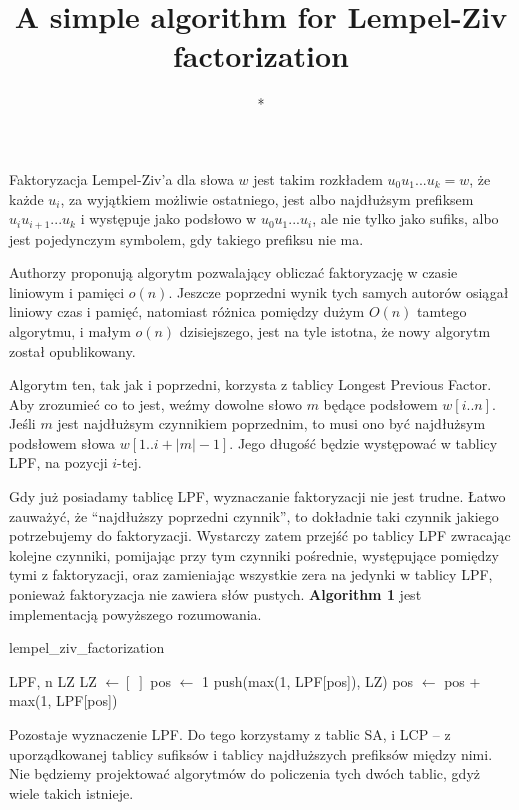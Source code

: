 \documentclass[a4paper,12pt]{article}
\title{A simple algorithm for Lempel-Ziv factorization}
\author{*}
\theoremstyle{definition}
\begin{document}
\maketitle

Faktoryzacja Lempel-Ziv'a dla słowa $w$ jest takim rozkładem $u_0 u_1 ... u_k = w$,
że każde $u_i$, za wyjątkiem możliwie ostatniego,
jest albo najdłużsym prefiksem $u_i u_{i + 1} ... u_k$ i występuje jako podsłowo w $u_0 u_1 ... u_i$,
ale nie tylko jako sufiks,
albo jest pojedynczym symbolem, gdy takiego prefiksu nie ma.

Authorzy proponują algorytm pozwalający obliczać faktoryzację w czasie liniowym i pamięci $o(n)$.
Jeszcze poprzedni wynik tych samych autorów osiągał liniowy czas i pamięć,
natomiast różnica pomiędzy dużym $O(n)$ tamtego algorytmu, i małym $o(n)$ dzisiejszego, jest na tyle istotna,
że nowy algorytm został opublikowany.

Algorytm ten, tak jak i poprzedni, korzysta z tablicy Longest Previous Factor.
Aby zrozumieć co to jest, weźmy dowolne słowo $m$ będące podsłowem $w[i..n]$.
Jeśli $m$ jest najdłużsym czynnikiem poprzednim,
to musi ono być najdłużsym podsłowem słowa $w[1..i + |m| - 1]$.
Jego długość będzie występować w tablicy LPF, na pozycji $i$-tej.

Gdy już posiadamy tablicę LPF, wyznaczanie faktoryzacji nie jest trudne.
Łatwo zauważyć, że ``najdłuższy poprzedni czynnik'', to dokładnie taki czynnik jakiego potrzebujemy do faktoryzacji.
Wystarczy zatem przejść po tablicy LPF zwracając kolejne czynniki,
pomijając przy tym czynniki pośrednie, występujące pomiędzy tymi z faktoryzacji,
oraz zamieniając wszystkie zera na jedynki w tablicy LPF, ponieważ faktoryzacja nie zawiera słów pustych.
\textbf{Algorithm 1} jest implementacją powyższego rozumowania.

\begin{algorithm}
\caption{lempel\_ziv\_factorization}
\begin{algorithmic} 
\REQUIRE LPF, n
\ENSURE LZ
\STATE LZ $\gets [\;]$
\STATE pos $\gets$ 1
\STATE push(max(1, LPF[pos]), LZ)
\STATE pos $\gets$ pos + max(1, LPF[pos])
\ENDWHILE
\end{algorithmic}
\end{algorithm}

Pozostaje wyznaczenie LPF. Do tego korzystamy z tablic SA, i LCP --
z uporządkowanej tablicy sufiksów i tablicy najdłuższych prefiksów między nimi.
Nie będziemy projektować algorytmów do policzenia tych dwóch tablic,
gdyż wiele takich istnieje.
\end{document}
